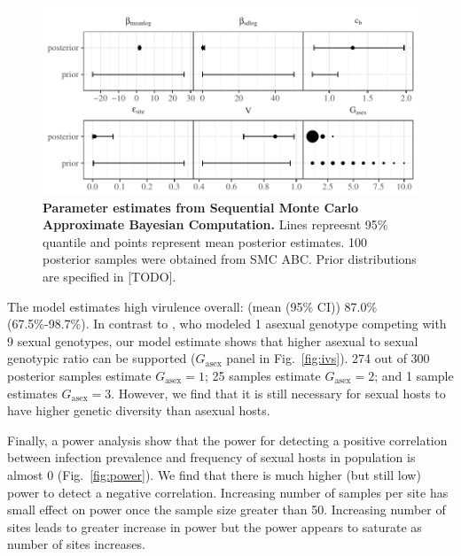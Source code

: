 \documentclass{article}\usepackage[]{graphicx}\usepackage[]{color}
\newcommand{\fref}[1]{Fig.~\ref{fig:#1}}
\begin{document}
\begin{figure}[!ht]
\includegraphics[width=\textwidth]{../fig/verg_post.pdf}
\caption{{\bf Parameter estimates from Sequential Monte Carlo Approximate Bayesian Computation.}
Lines repreesnt 95\% quantile and points represent mean posterior estimates. 100 posterior samples were obtained from SMC ABC. Prior distributions are specified in [TODO].
}
\label{fig:smcparam}
\end{figure}

The model estimates high virulence overall: (mean (95\% CI)) 87.0\% (67.5\%-98.7\%).
In contrast to \cite{lively2010epidemiological}, who modeled 1 asexual genotype competing with 9 sexual genotypes, our model estimate shows that higher asexual to sexual genotypic ratio can be supported ($G_{\textrm{asex}}$ panel in \fref{ivs}).
274 out of 300 posterior samples estimate $G_{\textrm{asex}} = 1$; 25 samples estimate $G_{\textrm{asex}} = 2$; and 1 sample estimates $G_{\textrm{asex}} = 3$.
However, we find that it is still necessary for sexual hosts to have higher genetic diversity than asexual hosts.

Finally, a power analysis show that the power for detecting a positive correlation between infection prevalence and frequency of sexual hosts in \cite{vergara2014infection} population is almost 0 (\fref{power}).
We find that there is much higher (but still low) power to detect a negative correlation.
Increasing number of samples per site has small effect on power once the sample size greater than 50.
Increasing number of sites leads to greater increase in power but the power appears to saturate as number of sites increases.
\end{document}
